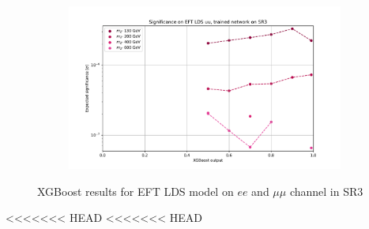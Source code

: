 \documentclass[12pt, a4paper]{book}
\begin{document}
\begin{figure}[!ht]
\begin{subfigure}[b]{0.49\textwidth}
   \end{subfigure}
   \hfill
   \begin{subfigure}[b]{0.49\textwidth}
      \centering
      \includegraphics[width=1\textwidth]{XGBoost/Model_independent/150/EFT_LDS/EXP_SIG_uu.pdf}
   \end{subfigure}
   \caption{XGBoost results for EFT LDS model on $ee$ and $\mu\mu$ channel in SR3}\label{fig:EFT_LDS_SR3}
\end{figure}
<<<<<<< HEAD
<<<<<<< HEAD
\end{document}
